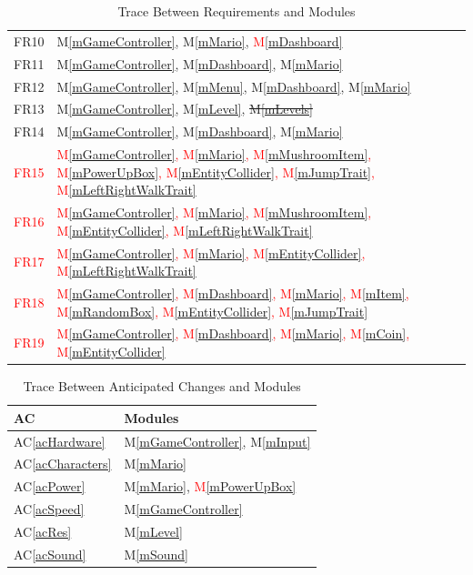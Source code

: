 \documentclass[12pt, titlepage]{article}
\newcommand{\acref}[1]{AC\ref{#1}}
\newcommand{\mref}[1]{M\ref{#1}}
\begin{document}
\begin{table}[H]
\begin{tabular}{p{} p{}}
FR10 & \mref{mGameController}, \mref{mMario}, \textcolor{red}{\mref{mDashboard}} \\
FR11 & \mref{mGameController}, \mref{mDashboard}, \mref{mMario}\\
FR12 & \mref{mGameController}, \mref{mMenu}, \mref{mDashboard}, \mref{mMario}\\
FR13 & \mref{mGameController}, \mref{mLevel}, \sout{\mref{mLevels}}\\
FR14 & \mref{mGameController}, \mref{mDashboard}, \mref{mMario}\\
\textcolor{red}{FR15} & \textcolor{red}{\mref{mGameController}, \mref{mMario}, \mref{mMushroomItem}, \mref{mPowerUpBox}, \mref{mEntityCollider}, \mref{mJumpTrait}, \mref{mLeftRightWalkTrait}}\\
\textcolor{red}{FR16} & \textcolor{red}{\mref{mGameController}, \mref{mMario}, \mref{mMushroomItem}, \mref{mEntityCollider}, \mref{mLeftRightWalkTrait}}\\
\textcolor{red}{FR17} & \textcolor{red}{\mref{mGameController}, \mref{mMario}, \mref{mEntityCollider}, \mref{mLeftRightWalkTrait}}\\
\textcolor{red}{FR18} & \textcolor{red}{\mref{mGameController}, \mref{mDashboard}, \mref{mMario}, \mref{mItem}, \mref{mRandomBox}, \mref{mEntityCollider}, \mref{mJumpTrait}}\\
\textcolor{red}{FR19} & \textcolor{red}{\mref{mGameController}, \mref{mDashboard}, \mref{mMario}, \mref{mCoin}, \mref{mEntityCollider}}\\

\bottomrule
\end{tabular}
\caption{Trace Between Requirements and Modules}
\label{TblRT}
\end{table}

\begin{table}[H]
\centering
\begin{tabular}{p{} p{}}
\toprule
\textbf{AC} & \textbf{Modules}\\
\midrule
\acref{acHardware} & \mref{mGameController}, \mref{mInput}\\
\acref{acCharacters} & \mref{mMario}\\
\acref{acPower} & \mref{mMario}, \textcolor{red}{\mref{mPowerUpBox}}\\
\acref{acSpeed} & \mref{mGameController}\\
\acref{acRes} & \mref{mLevel}\\
\acref{acSound} & \mref{mSound}\\

\bottomrule
\end{tabular}
\caption{Trace Between Anticipated Changes and Modules}
\label{TblACT}
\end{table}
\end{document}
